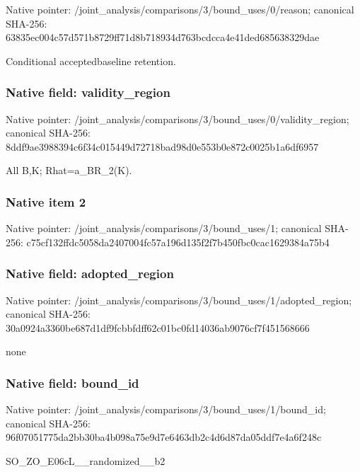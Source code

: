 \documentclass[10pt,a4paper]{article}
\begin{document}
Native pointer: /joint\_analysis/comparis\allowbreak{}ons/3/bound\_uses/0/reaso\allowbreak{}n; canonical SHA-256: 63835ec004c57d571b8729ff\allowbreak{}71d8b718934d763bcdcca4e4\allowbreak{}1ded685638329dae


Conditional acceptedbaseline retention.


\subsubsection{Native field: validity\_region}


Native pointer: /joint\_analysis/comparis\allowbreak{}ons/3/bound\_uses/0/valid\allowbreak{}ity\_region; canonical SHA-256: 8ddf9ae3988394c6f34c0154\allowbreak{}49d72718bad98d0e553b0e87\allowbreak{}2c0025b1a6df6957


All B,K; Rhat=a\_BR\_2(K).


\subsubsection{Native item 2}


Native pointer: /joint\_analysis/comparis\allowbreak{}ons/3/bound\_uses/1; canonical SHA-256: c75cf132ffdc5058da240700\allowbreak{}4fc57a196d135f2f7b450fbc\allowbreak{}0cac1629384a75b4



\subsubsection{Native field: adopted\_region}


Native pointer: /joint\_analysis/comparis\allowbreak{}ons/3/bound\_uses/1/adopt\allowbreak{}ed\_region; canonical SHA-256: 30a0924a3360be687d1df9fc\allowbreak{}bbfdff62c01bc0fd14036ab9\allowbreak{}076cf7f451568666


none


\subsubsection{Native field: bound\_id}


Native pointer: /joint\_analysis/comparis\allowbreak{}ons/3/bound\_uses/1/bound\allowbreak{}\_id; canonical SHA-256: 96f07051775da2bb30ba4b09\allowbreak{}8a75e9d7e6463db2c4d6d87d\allowbreak{}a05ddf7e4a6f248c


SO\_ZO\_E06cL\_\_randomized\_\_b2
\end{document}
